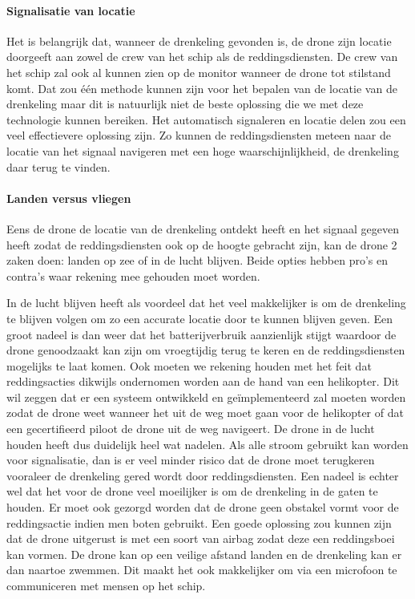 \paragraph{Signalisatie van locatie}

Het is belangrijk dat, wanneer de drenkeling gevonden is, de drone zijn locatie doorgeeft aan zowel de crew van het schip als de reddingsdiensten. De crew van het schip zal ook al kunnen zien op de monitor wanneer de drone tot stilstand komt. Dat zou één methode kunnen zijn voor het bepalen van de locatie van de drenkeling maar dit is natuurlijk niet de beste oplossing die we met deze technologie kunnen bereiken. Het automatisch signaleren en locatie delen zou een veel effectievere oplossing zijn. Zo kunnen de reddingsdiensten meteen naar de locatie van het signaal navigeren met een hoge waarschijnlijkheid, de drenkeling daar terug te vinden.  

\paragraph{Landen versus vliegen}

Eens de drone de locatie van de drenkeling ontdekt heeft en het signaal gegeven heeft zodat de reddingsdiensten ook op de hoogte gebracht zijn, kan de drone 2 zaken doen: landen op zee of in de lucht blijven. Beide opties hebben pro's en contra's waar rekening mee gehouden moet worden. 

In de lucht blijven heeft als voordeel dat het veel makkelijker is om de drenkeling te blijven volgen om zo een accurate locatie door te kunnen blijven geven. Een groot nadeel is dan weer dat het batterijverbruik aanzienlijk stijgt waardoor de drone genoodzaakt kan zijn om vroegtijdig terug te keren en de reddingsdiensten mogelijks te laat komen. Ook moeten we rekening houden met het feit dat reddingsacties dikwijls ondernomen worden aan de hand van een helikopter. Dit wil zeggen dat er een systeem ontwikkeld en geïmplementeerd zal moeten worden zodat de drone weet wanneer het uit de weg moet gaan voor de helikopter of dat een gecertifieerd piloot de drone uit de weg navigeert. De drone in de lucht houden heeft dus duidelijk heel wat nadelen. Als alle stroom gebruikt kan worden voor signalisatie, dan is er veel minder risico dat de drone moet terugkeren vooraleer de drenkeling gered wordt door reddingsdiensten. Een nadeel is echter wel dat het voor de drone veel moeilijker is om de drenkeling in de gaten te houden. Er moet ook gezorgd worden dat de drone geen obstakel vormt voor de reddingsactie indien men boten gebruikt. Een goede oplossing zou kunnen zijn dat de drone uitgerust is met een soort van airbag zodat deze een reddingsboei kan vormen. De drone kan op een veilige afstand landen en de drenkeling kan er dan naartoe zwemmen. Dit maakt het ook makkelijker om via een microfoon te communiceren met mensen op het schip. 


